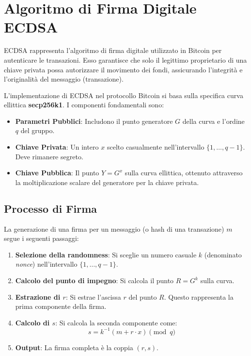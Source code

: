 \section{Algoritmo di Firma Digitale ECDSA}

ECDSA rappresenta l'algoritmo di firma digitale utilizzato in Bitcoin per autenticare le transazioni. Esso garantisce che solo il legittimo proprietario di una chiave privata possa autorizzare il movimento dei fondi, assicurando l'integrità e l'originalità del messaggio (transazione).

L'implementazione di ECDSA nel protocollo Bitcoin si basa sulla specifica curva ellittica \textbf{secp256k1}. I componenti fondamentali sono:

\begin{itemize}
    \item \textbf{Parametri Pubblici}: Includono il punto generatore $G$ della curva e l'ordine $q$ del gruppo.
    \item \textbf{Chiave Privata}: Un intero $x$ scelto casualmente nell'intervallo $\{1, \dots, q-1\}$. Deve rimanere segreto.
    \item \textbf{Chiave Pubblica}: Il punto $Y = G^x$ sulla curva ellittica, ottenuto attraverso la moltiplicazione scalare del generatore per la chiave privata.
\end{itemize}

\subsection{Processo di Firma}
La generazione di una firma per un messaggio (o hash di una transazione) $m$ segue i seguenti passaggi:

\begin{enumerate}
    \item \textbf{Selezione della randomness}: Si sceglie un numero casuale $k$ (denominato \textit{nonce}) nell'intervallo $\{1, \dots, q-1\}$.
    \item \textbf{Calcolo del punto di impegno}: Si calcola il punto $R = G^k$ sulla curva.
    \item \textbf{Estrazione di $r$}: Si estrae l'ascissa $r$ del punto $R$. Questo rappresenta la prima componente della firma.
    \item \textbf{Calcolo di $s$}: Si calcola la seconda componente come:
    \[ s = k^{-1}(m + r \cdot x) \pmod q \]
    \item \textbf{Output}: La firma completa è la coppia $(r, s)$.
\end{enumerate}


